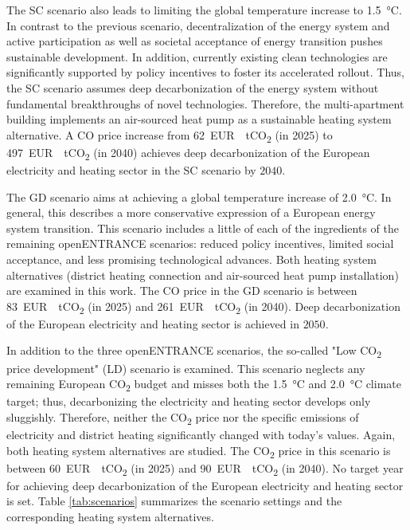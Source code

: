 The SC scenario also leads to limiting the global temperature increase to \SI{1.5}{\degreeCelsius}. In contrast to the previous scenario, decentralization of the energy system and active participation as well as societal acceptance of energy transition pushes sustainable development. In addition, currently existing clean technologies are significantly supported by policy incentives to foster its accelerated rollout. Thus, the SC scenario assumes deep decarbonization of the energy system without fundamental breakthroughs of novel technologies. Therefore, the multi-apartment building implements an air-sourced heat pump as a sustainable heating system alternative. A CO price increase from \SI{62}{EUR \per tCO_{2}} (in 2025) to \SI{497}{EUR \per tCO_{2}} (in 2040) achieves deep decarbonization of the European electricity and heating sector in the SC scenario by $2040$.\vspace{0.5cm}

The GD scenario aims at achieving a global temperature increase of \SI{2.0}{\degreeCelsius}. In general, this describes a more conservative expression of a European energy system transition. This scenario includes a little of each of the ingredients of the remaining openENTRANCE scenarios: reduced policy incentives, limited social acceptance, and less promising technological advances. Both heating system alternatives (district heating connection and air-sourced heat pump installation) are examined in this work. The CO price in the GD scenario is between \SI{83}{EUR \per tCO_{2}} (in 2025) and \SI{261}{EUR \per tCO_{2}} (in 2040). Deep decarbonization of the European electricity and heating sector is achieved in $2050$.\vspace{0.5cm}

In addition to the three openENTRANCE scenarios, the so-called "Low CO\textsubscript{2} price development" (LD) scenario is examined. This scenario neglects any remaining European CO\textsubscript{2} budget and misses both the  \SI{1.5}{\degreeCelsius} and \SI{2.0}{\degreeCelsius} climate target; thus, decarbonizing the electricity and heating sector develops only sluggishly. Therefore, neither the CO\textsubscript{2} price nor the specific emissions of electricity and district heating significantly changed with today's values. Again, both heating system alternatives are studied. The CO\textsubscript{2} price in this scenario is between \SI{60}{EUR \per tCO_{2}} (in 2025) and \SI{90}{EUR \per tCO_{2}} (in 2040). No target year for achieving deep decarbonization of the European electricity and heating sector is set. Table \ref{tab:scenarios} summarizes the scenario settings and the corresponding heating system alternatives. 

